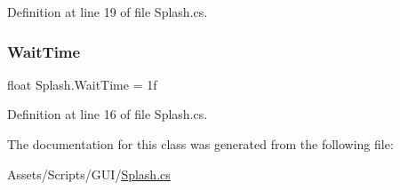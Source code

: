 Definition at line 19 of file Splash.\+cs.

\mbox{\label{class_splash_aab9712e04bfa3cd947ca0f5a09cc25f0}} 
\subsubsection{\texorpdfstring{Wait\+Time}{WaitTime}}
{\footnotesize\ttfamily float Splash.\+Wait\+Time = 1f}



Definition at line 16 of file Splash.\+cs.



The documentation for this class was generated from the following file\+:\begin{DoxyCompactItemize}
\item 
Assets/\+Scripts/\+G\+U\+I/\mbox{\hyperlink{_splash_8cs}{Splash.\+cs}}\end{DoxyCompactItemize}
